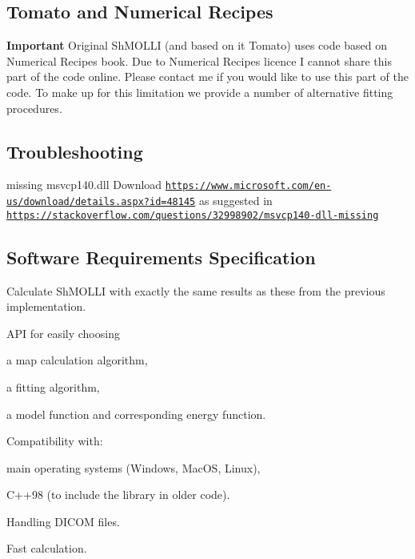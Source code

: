 \subsection*{Tomato and Numerical Recipes}

{\bfseries Important} Original Sh\-M\-O\-L\-L\-I (and based on it Tomato) uses code based on Numerical Recipes book. Due to Numerical Recipes licence I cannot share this part of the code online. Please contact me if you would like to use this part of the code. To make up for this limitation we provide a number of alternative fitting procedures.

\subsection*{Troubleshooting}


\begin{DoxyItemize}
\item missing msvcp140.\-dll Download \href{https://www.microsoft.com/en-us/download/details.aspx?id=48145}{\tt https\-://www.\-microsoft.\-com/en-\/us/download/details.\-aspx?id=48145} as suggested in \href{https://stackoverflow.com/questions/32998902/msvcp140-dll-missing}{\tt https\-://stackoverflow.\-com/questions/32998902/msvcp140-\/dll-\/missing}
\end{DoxyItemize}

\subsection*{Software Requirements Specification}


\begin{DoxyEnumerate}
\item Calculate Sh\-M\-O\-L\-L\-I with exactly the same results as these from the previous implementation.
\item A\-P\-I for easily choosing
\begin{DoxyItemize}
\item a map calculation algorithm,
\item a fitting algorithm,
\item a model function and corresponding energy function.
\end{DoxyItemize}
\item Compatibility with\-:
\begin{DoxyItemize}
\item main operating systems (Windows, Mac\-O\-S, Linux),
\item C++98 (to include the library in older code).
\end{DoxyItemize}
\item Handling D\-I\-C\-O\-M files.
\item Fast calculation.
\end{DoxyEnumerate}

